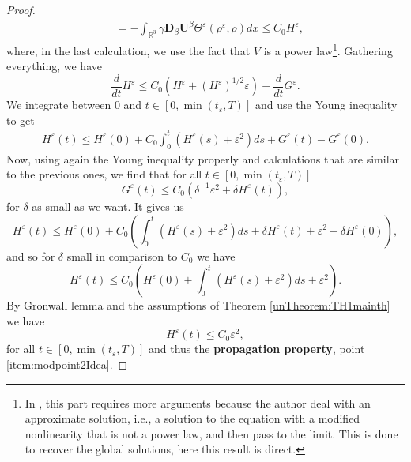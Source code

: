 \documentclass[a4paper, 15pt]{article}
\numberwithin{equation}{section}
\begin{document}
\begin{proof}
\begin{align*}
    &=-\int_{\mathbb{R}^3}{\gamma\textbf{D}_\beta \textbf{U}^\beta\Theta^\varepsilon(\rho^\varepsilon,\rho)dx}\leq C_0H^\varepsilon,
\end{align*}
where, in the last calculation, we use the fact that $V$ is a power law\footnote{In \cite{zbMATH05243173}, this part requires more arguments because the author deal with an approximate solution, i.e., a solution to the equation with a modified nonlinearity that is not a power law, and then pass to the limit. This is done to recover the global solutions, here this result is direct.}. 
Gathering everything, we have 
\begin{equation}
\label{eq:ineqHGgoodPgproof}
		\frac{d}{dt}H^\varepsilon\leq C_0\left(H^\varepsilon+(H^\varepsilon)^{1/2}\varepsilon\right)+\frac{d}{dt}G^\varepsilon.
\end{equation}
We integrate between $0$ and $t\in[0,\min(t_\varepsilon,T)]$ and use the Young inequality to get 
\begin{align*}
		H^\varepsilon(t)\leq H^\varepsilon(0)+C_0\int^{t}_0{\left(H^\varepsilon(s)+\varepsilon^2 \right)ds}+G^\varepsilon(t)-G^\varepsilon(0).
\end{align*}
Now, using again the Young inequality properly and calculations that are similar to the previous ones, we find that for all $t\in[0,\min(t_\varepsilon,T)]$
\begin{equation*}
		G^\varepsilon(t)\leq C_0(\delta^{-1}\varepsilon^2+\delta H^\varepsilon(t)),
\end{equation*}
for $\delta$ as small as we want. It gives us
\begin{equation}
\label{eq:almostHgoodPgproof}
				H^\varepsilon(t)\leq H^\varepsilon(0)+C_0(\int^{t}_0{\left(H^\varepsilon(s)+\varepsilon^2 \right) ds}+\delta H^\varepsilon(t)+\varepsilon^2+\delta H^\varepsilon(0)),
\end{equation}
and so for $\delta$ small in comparison to $C_0$ we have
\begin{equation}
\label{eq:finalHPgproof}
		H^\varepsilon(t)\leq C_0( H^\varepsilon(0)+\int^{t}_0{\left(H^\varepsilon(s)+\varepsilon^2 \right)ds}+\varepsilon^2).
\end{equation}
By Gronwall lemma and the assumptions of Theorem \ref{unTheorem:TH1mainth} we have
\begin{equation}
\label{eq:finalHsmallPgproof}
		H^\varepsilon(t)\leq C_0\varepsilon^2,
\end{equation}
for all $t\in[0,\min(t_\varepsilon,T)]$ and thus the \textbf{propagation property}, point \ref{item:modpoint2Idea}.
    
\end{proof}
\end{document}
